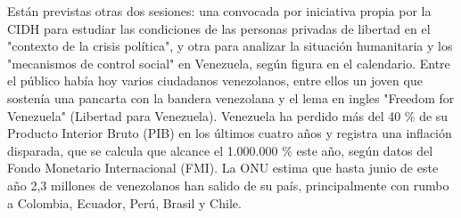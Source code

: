 \documentclass{article}%
\begin{document}
\newline%
%
Están previstas otras dos sesiones: una convocada por iniciativa propia por la CIDH para estudiar las condiciones de las personas privadas de libertad en el "contexto de la crisis política", y otra para analizar la situación humanitaria y los "mecanismos de control social" en Venezuela, según figura en el calendario.%
\newline%
%
Entre el público había hoy varios ciudadanos venezolanos, entre ellos un joven que sostenía una pancarta con la bandera venezolana y el lema en ingles "Freedom for Venezuela" (Libertad para Venezuela).%
\newline%
%
Venezuela ha perdido más del 40 \% de su Producto Interior Bruto (PIB) en los últimos cuatro años y registra una inflación disparada, que se calcula que alcance el 1.000.000 \% este año, según datos del Fondo Monetario Internacional (FMI).%
\newline%
%
La ONU estima que hasta junio de este año 2,3 millones de venezolanos han salido de su país, principalmente con rumbo a Colombia, Ecuador, Perú, Brasil y Chile.%
\newline%
%
\end{document}
